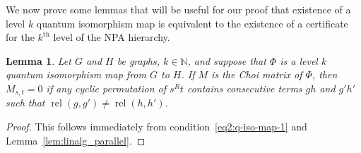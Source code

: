 \documentclass[a4paper,onecolumn,11pt,accepted=2026-01-06]{quantumarticle}
\theoremstyle{plain}
\newtheorem{lem}[thm]{Lemma}
\theoremstyle{remark}
\theoremstyle{definition}
\DeclareMathOperator{\rel}{rel}
\begin{document}
We now prove some lemmas that will be useful for our proof that existence of a level $k$ quantum isomorphism map is equivalent to the existence of a certificate for the $k^\text{th}$ level of the NPA hierarchy.

\begin{lem}\label{lem:Mzeros}
    Let $G$ and $H$ be graphs, $k \in \mathbb{N}$, and suppose that $\Phi$ is a level $k$ quantum isomorphism map from $G$ to $H$. If $M$ is the Choi matrix of $\Phi$, then $M_{s,t} = 0$ if any cyclic permutation of $s^Rt$ contains consecutive terms $gh$ and $g'h'$ such that $\rel(g,g') \ne \rel(h,h')$.
\end{lem}
\begin{proof}
    This follows immediately from condition~\eqref{eq2:q-iso-map-1} and Lemma~\ref{lem:linalg_parallel}.
\end{proof}
\end{document}
